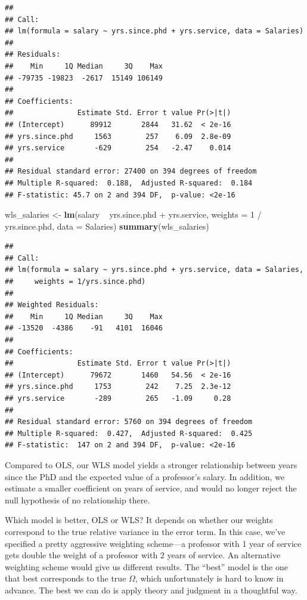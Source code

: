 \documentclass[12pt,oneside,openany]{book}
\newenvironment{Shaded}{\begin{snugshade}}{\end{snugshade}}
\newcommand{\KeywordTok}[1]{\textcolor[rgb]{0.13,0.29,0.53}{\textbf{{#1}}}}
\newcommand{\DataTypeTok}[1]{\textcolor[rgb]{0.13,0.29,0.53}{{#1}}}
\newcommand{\DecValTok}[1]{\textcolor[rgb]{0.00,0.00,0.81}{{#1}}}
\newcommand{\StringTok}[1]{\textcolor[rgb]{0.31,0.60,0.02}{{#1}}}
\newcommand{\NormalTok}[1]{{#1}}
\begin{document}
\begin{verbatim}
## 
## Call:
## lm(formula = salary ~ yrs.since.phd + yrs.service, data = Salaries)
## 
## Residuals:
##    Min     1Q Median     3Q    Max 
## -79735 -19823  -2617  15149 106149 
## 
## Coefficients:
##               Estimate Std. Error t value Pr(>|t|)
## (Intercept)      89912       2844   31.62  < 2e-16
## yrs.since.phd     1563        257    6.09  2.8e-09
## yrs.service       -629        254   -2.47    0.014
## 
## Residual standard error: 27400 on 394 degrees of freedom
## Multiple R-squared:  0.188,  Adjusted R-squared:  0.184 
## F-statistic: 45.7 on 2 and 394 DF,  p-value: <2e-16
\end{verbatim}

\begin{Shaded}
\begin{Highlighting}[]
\NormalTok{wls_salaries <-}\StringTok{ }\KeywordTok{lm}\NormalTok{(salary ~}\StringTok{ }\NormalTok{yrs.since.phd +}\StringTok{ }\NormalTok{yrs.service,}
                   \DataTypeTok{weights =} \DecValTok{1} \NormalTok{/}\StringTok{ }\NormalTok{yrs.since.phd,}
                   \DataTypeTok{data =} \NormalTok{Salaries)}
\KeywordTok{summary}\NormalTok{(wls_salaries)}
\end{Highlighting}
\end{Shaded}

\begin{verbatim}
## 
## Call:
## lm(formula = salary ~ yrs.since.phd + yrs.service, data = Salaries, 
##     weights = 1/yrs.since.phd)
## 
## Weighted Residuals:
##    Min     1Q Median     3Q    Max 
## -13520  -4386    -91   4101  16046 
## 
## Coefficients:
##               Estimate Std. Error t value Pr(>|t|)
## (Intercept)      79672       1460   54.56  < 2e-16
## yrs.since.phd     1753        242    7.25  2.3e-12
## yrs.service       -289        265   -1.09     0.28
## 
## Residual standard error: 5760 on 394 degrees of freedom
## Multiple R-squared:  0.427,  Adjusted R-squared:  0.425 
## F-statistic:  147 on 2 and 394 DF,  p-value: <2e-16
\end{verbatim}

Compared to OLS, our WLS model yields a stronger relationship between
years since the PhD and the expected value of a professor's salary. In
addition, we estimate a smaller coefficient on years of service, and
would no longer reject the null hypothesis of no relationship there.

Which model is better, OLS or WLS? It depends on whether our weights
correspond to the true relative variance in the error term. In this
case, we've specified a pretty aggressive weighting scheme---a professor
with 1 year of service gets double the weight of a professor with 2
years of service. An alternative weighting scheme would give us
different results. The ``best'' model is the one that best corresponds
to the true \(\Omega\), which unfortunately is hard to know in advance.
The best we can do is apply theory and judgment in a thoughtful way.
\end{document}
